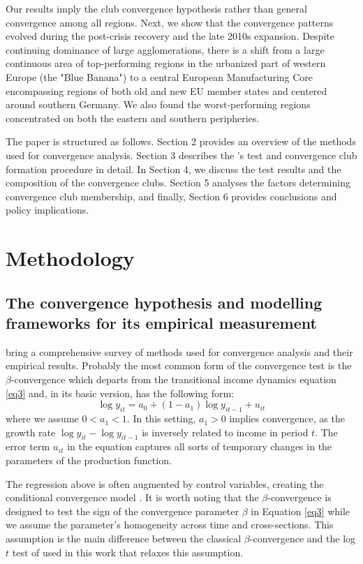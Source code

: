 \documentclass[11pt]{article}
\begin{document}
Our results imply the club convergence hypothesis rather than general convergence among all regions. Next, we show that the convergence patterns evolved during the post-crisis recovery and the late 2010s expansion. Despite continuing dominance of large agglomerations, there is a shift from a large continuous area of top-performing regions in the urbanized part of western Europe (the "Blue Banana") to a central European Manufacturing Core encompassing regions of both old and new EU member states and centered around southern Germany. We also found the worst-performing regions concentrated on both the eastern and southern peripheries.


The paper is structured as follows. Section 2 provides an overview of the methods used for convergence analysis. Section 3 describes the \citeauthor{phillips2007transition}'s test and convergence club formation procedure in detail. In Section 4, we discuss the test results and the composition of the convergence clubs. Section 5 analyses the factors determining convergence club membership, and finally, Section 6 provides conclusions and policy implications.  


\section{Methodology}\label{Methodology}
\subsection{The convergence hypothesis and modelling frameworks for its empirical measurement}

\citet{eckey2007convergence} bring a comprehensive survey of methods used for convergence analysis and their empirical results. Probably the most common form of the convergence test is the $\beta$-convergence which departs from the transitional income dynamics equation \eqref{eq3} and, in its basic version, has the following form:
\begin{equation} \label{eq1}\log y_{it} = a_{0} + (1 - a_{1})\log y_{it-1} + u_{it} \end{equation}
where we assume \(0 < a_{1} < 1\). In this setting, \(a_{1} > 0 \) implies convergence, as the growth rate \(\log y_{it} - \log y_{it-1}\) is inversely related to income in period $t$. The error term $u_{it}$ in the equation captures all sorts of temporary changes in the parameters of the production function.

The regression above is often augmented by control variables, creating the conditional convergence model \citep{sala1996regional}. It is worth noting that the $\beta$-convergence is designed to test the sign of the convergence parameter $\beta$ in Equation \ref{eq3} while we assume the parameter's homogeneity across time and cross-sections. This assumption is the main difference between the classical  $\beta$-convergence and the log $t$ test of \citet{phillips2007transition} used in this work that relaxes this assumption.
\end{document}

